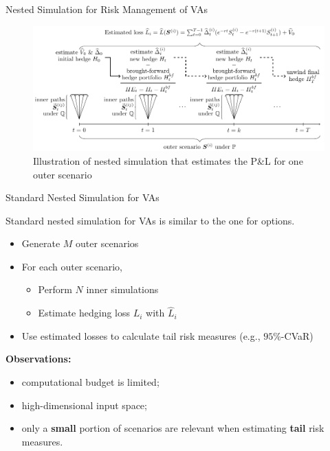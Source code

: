 \documentclass[9pt,handout]{beamer}
\begin{document}
\begin{frame}{Nested Simulation for Risk Management of VAs}

    \begin{figure}[c]
        \includegraphics[width=\textwidth]{../project2/figures/sns.pdf}
        \caption{Illustration of nested simulation that estimates the P\&L for one outer scenario}
    \end{figure}


\end{frame}

\begin{frame}{Standard Nested Simulation for VAs}

Standard nested simulation for VAs is similar to the one for options.

\begin{itemize}
    \item Generate $M$ outer scenarios
    \item For each outer scenario,
    \begin{itemize}
        \item Perform $N$ inner simulations
        \item Estimate hedging loss $L_i$ with $\hat{L}_i$
    \end{itemize}
    \item Use estimated losses to calculate tail risk measures (e.g., $95\%$-CVaR)
\end{itemize}

\vspace{10pt}

\textbf{Observations:}
\begin{itemize}
    \item computational budget is limited;
    \item high-dimensional input space;
    \item only a \textbf{small} portion of scenarios are relevant when estimating \textbf{tail} risk measures.
\end{itemize}

\end{frame}
\end{document}
